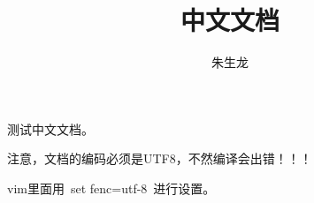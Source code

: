 \documentclass[UTF8, a4paper, 12pt]{ctexart}
\title{中文文档}
\author{朱生龙}
\begin{document}
\maketitle

测试中文文档。

注意，文档的编码必须是UTF8，不然编译会出错！！！

vim里面用\ set fenc=utf-8\ 进行设置。
\end{document}
